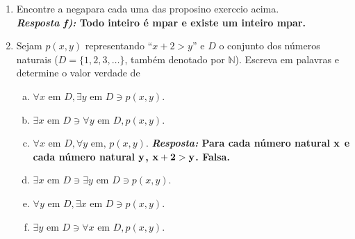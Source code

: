 \begin{enumerate}[{\bf 1.}]
\begin{enumerate}[a)]
{\bf{\it Resposta:}  Sejam ${\bf D}$ o conjunto dos n\'umeros inteiros pares, ${\bf p(x,y)}$ ``${\bf x+y}$ pertence \`a D''. Ent\ao a proposi\cao \'e ${\bf \forall x,y \textrm{ em } D, p(x,y)}$.}

\item Todo subconjunto fechado e limitado de $\mathbb{R}$ \'e compacto.

{\bf{\it Resposta:}  Sejam ${\bf D}$ o conjunto dos subconjuntos de $\mathbb{R}$, ${\bf p(x)}$ ``${\bf x}$ \'e fechado'', ${\bf q(x)}$ ``${\bf x}$ \'e limitado'', ${\bf r(x)}$ ``${\bf x}$ \'e compacto''. Ent\ao a proposi\cao \'e \\ ${\bf \forall x \textrm{ em } D, p(x)\ee q(x)\to r(x)}$.}
\end{enumerate}

\item Encontre a nega\cao para cada uma das proposi\coes no exerc\ih cio acima.\\
{\bf{\it Resposta f):} Todo inteiro \'e \ih mpar e existe um inteiro \ih mpar.}\\

\item Sejam $p(x,y)$ representando ``$x+2>y$'' e $D$ o conjunto dos n\'umeros naturais ($D=\{1,2,3,\ldots\}$, tamb\'em denotado por $\mathbb{N}$). Escreva em palavras e determine o valor verdade de
\begin{enumerate}[a)]
\item $\forall x \textrm{ em } D, \exists y \textrm{ em } D \ni p(x,y)$.
\item $\exists x \textrm{ em } D \ni \forall y \textrm{ em } D, p(x,y)$.
\item $\forall x \textrm{ em } D, \forall y \textrm{ em, } p(x,y)$. {\bf{\it Resposta:} Para cada n\'umero natural ${\bf x}$ e cada n\'umero natural ${\bf y}$, ${\bf x+2>y}$. Falsa.}
\item $\exists x \textrm{ em } D \ni \exists y \textrm{ em } D \ni p(x,y)$.
\item $\forall y \textrm{ em } D, \exists x \textrm{ em } D \ni p(x,y)$.
\item $\exists y \textrm{ em } D \ni \forall x \textrm{ em } D, p(x,y)$.
\end{enumerate} 


\end{enumerate}
